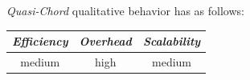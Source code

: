%
%
%
%
%
%
\emph{Quasi-Chord} qualitative behavior has as follows:
\begin{center}
{\footnotesize
\begin{tabular}{ccc}
\emph{Efficiency} & \emph{Overhead} & \emph{Scalability} \\
\hline
medium &
high &
medium
\end{tabular}
}
\end{center}

